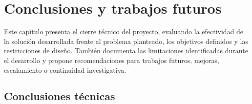 \documentclass[12pt,letterpaper]{report}
\begin{document}
\chapter{Conclusiones y trabajos futuros}

\begin{instrucciones}
Este capítulo presenta el cierre técnico del proyecto, evaluando la efectividad de la solución desarrollada frente al problema planteado, los objetivos definidos y las restricciones de diseño. También documenta las limitaciones identificadas durante el desarrollo y propone recomendaciones para trabajos futuros, mejoras, escalamiento o continuidad investigativa.
\end{instrucciones}

\section{Conclusiones técnicas}
\end{document}
